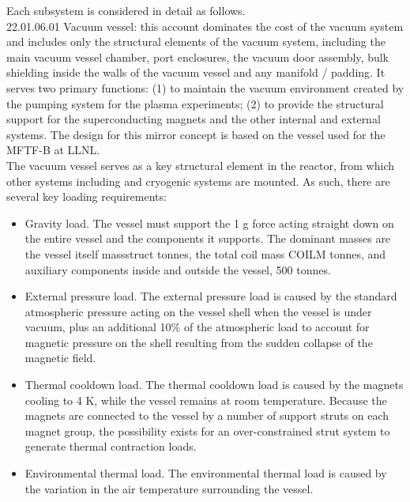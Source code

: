Each subsystem is considered in detail as follows. \\

22.01.06.01 Vacuum vessel: this account dominates the cost of the vacuum system and includes only the structural elements of the vacuum system, including the main vacuum vessel chamber, port enclosures, the vacuum door assembly, bulk shielding inside the walls of the vacuum vessel and any manifold / padding.
It serves two primary functions: (1) to maintain the vacuum environment created by the pumping system for the plasma experiments; (2) to provide the structural support for the superconducting magnets and the other internal and external systems. The design for this mirror concept is based on the vessel used for the MFTF-B at LLNL. \\

The vacuum vessel serves as a  key structural element in the reactor, from which other systems including and cryogenic systems are mounted.  As such, there are several key loading requirements:

\begin{itemize}
    \item Gravity load. The vessel must support the 1 g force acting straight down on the entire vessel and the components it supports. The dominant masses are the vessel itself massstruct tonnes, the total coil mass COILM tonnes, and auxiliary components inside and outside the vessel, 500 tonnes.

    \item External pressure load. The external pressure load is caused by the standard atmospheric pressure acting on the vessel shell when the vessel is under vacuum, plus an additional 10\% of the atmospheric load to account for magnetic  pressure on the shell resulting from the sudden collapse of the magnetic field. 

    \item Thermal cooldown load. The thermal cooldown load is  caused by the magnets cooling to 4 K, while the vessel remains at room temperature. Because the magnets are connected to the vessel by a number of support struts on each  magnet group, the possibility exists for an over-constrained  strut system to generate thermal contraction loads.

    \item Environmental thermal load. The environmental thermal load is caused by the variation in the air temperature surrounding the vessel.

\end{itemize}

